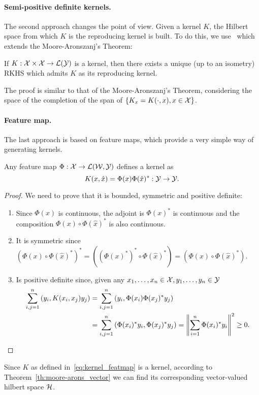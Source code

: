 \paragraph*{Semi-positive definite kernels.}
The second approach changes the point of view. Given a kernel $K$, the Hilbert space from which $K$ is the reproducing kernel is built.
To do this, we use~\cite[Theorem 2.1]{MicchelliP05} which extends the Moore-Aronszanj's Theorem:
\begin{theorem}\label{th:moore-arons_vector}
    If $K: \mathcal{X} \times \mathcal{X} \to \mathcal{L}(\mathcal{Y})$ is a kernel, then there exists a unique (up to an isometry) RKHS which admits $K$ as its reproducing kernel. 
\end{theorem}
The proof is similar to that of the Moore-Aronszanj's Theorem, considering the space of the completion of the span of $\left\lbrace K_x = K(\cdot, x) , x \in \mathcal{X} \right\rbrace$.

\paragraph*{Feature map.}
The last approach is based on feature maps, which provide a very simple way of generating kernels.
\begin{lemma}
    Any feature map $\Phi: \mathcal{X} \to \mathcal{L}(\mathcal{W}, \mathcal{Y})$ defines a kernel as
\begin{equation}
    \label{eq:kernel_featmap}
    K(x, \hat{x}) = \Phi(x) \Phi(\hat{x})^*: \Yspace \to \Yspace .
\end{equation}
\end{lemma}
\begin{proof} We need to prove that it is bounded, symmetric and positive definite:
    \begin{enumerate}
        \item Since $\Phi(x)$ is continuous, the adjoint is $\Phi(x)^*$ is continuous and the composition $\Phi(x) \circ \Phi(\hat{x})^*$ is also continuous.
        \item It is symmetric since  $(\Phi(x) \circ \Phi(\hat{x})^*)^* = ((\Phi(x)^*)^* \circ \Phi(\hat{x})^*) = (\Phi(x) \circ \Phi(\hat{x})^*) $.
        \item Is positive definite since, given any $x_1, \ldots, x_n \in \mathcal{X},  y_1, \ldots, y_n \in \mathcal{Y}$
        \begin{equation}
            \nonumber
            \begin{aligned}
                \sum_{i, j =1}^n \left( y_i, K(x_i, x_j) y_j \right) &= \sum_{i, j =1}^n \left( y_i,  \Phi(x_i) \Phi(x_j)^* y_j \right) \\
                & = \sum_{i, j =1}^n \left( \Phi(x_i)^* y_i,  \Phi(x_j)^* y_j \right) = \left\lVert\sum_{i=1}^n \Phi(x_i)^* y_i\right\rVert^2 \geq 0 .
            \end{aligned}
        \end{equation}
    \end{enumerate}
\end{proof}
Since $K$ as defined in~\eqref{eq:kernel_featmap} is a kernel, according to Theorem~\ref{th:moore-arons_vector} we can find its corresponding vector-valued hilbert space $\mathcal{H}$.

